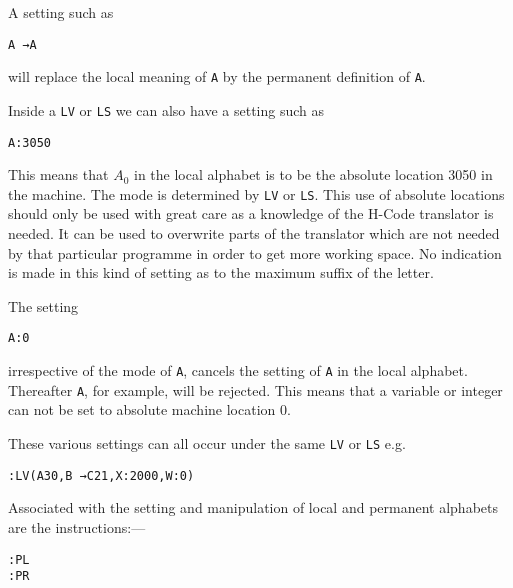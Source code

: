 \documentclass[10pt, a4paper, oneside]{article}
\newcommand{\mytt}[1]{\texttt{\scriptsize #1}}
\newcommand{\mytt}[1]{\texttt{\small #1}}
\begin{document}
\begin{multicols}{2}
A setting such as

\begin{addmargin}[1cm]{1em}%
\begin{lstlisting}
A →A
\end{lstlisting}
\end{addmargin}

will replace the local meaning of \mytt{A} by the permanent
definition of \mytt{A}.

Inside a \mytt{LV} or \mytt{LS} we can also have a setting such
as

\begin{addmargin}[1cm]{1em}%
\begin{lstlisting}
A:3050
\end{lstlisting}
\end{addmargin}

This means that $A_{0}$ in the local alphabet is to be the
absolute location 3050 in the machine.  The mode is
determined by \mytt{LV} or \mytt{LS}.  This use of absolute locations
should only be used with great care as a knowledge of
the H-Code translator is needed.  It can be used to
overwrite parts of the translator which are not needed
by that particular programme in order to get more
working space.  No indication is made in this kind of
setting as to the maximum suffix of the letter.

The setting

\begin{addmargin}[1cm]{1em}%
\begin{lstlisting}
A:0
\end{lstlisting}
\end{addmargin}

irrespective of the mode of \mytt{A}, cancels the setting of
\mytt{A} in the local alphabet.  Thereafter \mytt{A}, for example,
will be rejected.  This means that a variable or integer
can not be set to absolute machine location 0.

These various settings can all occur under the same
\mytt{LV} or \mytt{LS} e.g.

\begin{addmargin}[1cm]{1em}%
\begin{lstlisting}
:LV(A30,B →C21,X:2000,W:0)
\end{lstlisting}
\end{addmargin}

Associated with the setting and manipulation of
local and permanent alphabets are the instructions:—

\begin{addmargin}[1cm]{1em}%
\begin{lstlisting}
:PL
:PR
\end{lstlisting}
\end{addmargin}


\end{multicols}
\end{document}

